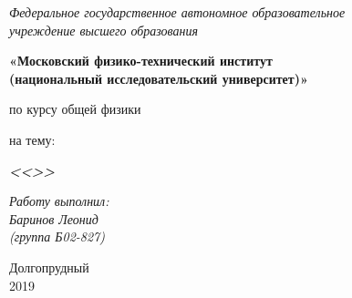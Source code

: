 \thispagestyle{empty}
\begin{center}
    \textit{Федеральное государственное автономное образовательное\\ учреждение высшего образования }

    \vspace{0.5ex}

        \textbf{«Московский физико-технический институт\\ (национальный исследовательский университет)»}
\end{center}

\vspace{10ex}

\begin{center}
    \vspace{13ex}


    \vspace{1ex}

    по курсу общей физики

    на тему:

    \textbf{\textit{<<>>}}

    \vspace{30ex}

    \begin{flushright}
        \noindent
        \textit{Работу выполнил:}\\  
        \textit{Баринов Леонид \\(группа Б02-827)}
    \end{flushright}
    \vfill
    Долгопрудный \\2019
\newpage
\setcounter{page}{1}
\fancyhead[R]{\nouppercase{\leftmark}}	
\end{center}
